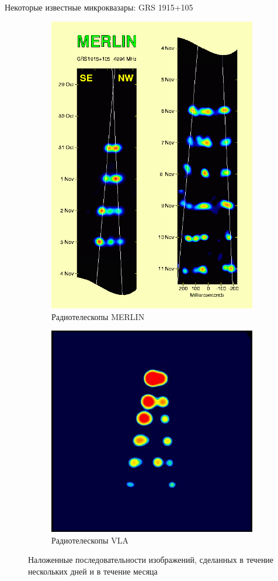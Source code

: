 \documentclass[8pt]{beamer}
\begin{document}
\begin{frame}{Некоторые известные микроквазары: GRS 1915+105}
    \begin{figure}
        \begin{subfigure}{0.45\textwidth}
            \centering
            \includegraphics[height=.9\linewidth]{resources/Merlin-GRS1915.png}
            \caption{Радиотелескопы MERLIN}
        \end{subfigure}
        \begin{subfigure}{0.45\textwidth}
            \centering
            \includegraphics[height=.9\linewidth]{resources/Grs1915_radio.jpg}
            \caption{Радиотелескопы VLA}
        \end{subfigure}
        
        \caption{Наложенные последовательности изображений, сделанных в течение нескольких дней и в течение месяца}
    \end{figure}
\end{frame}
\end{document}
